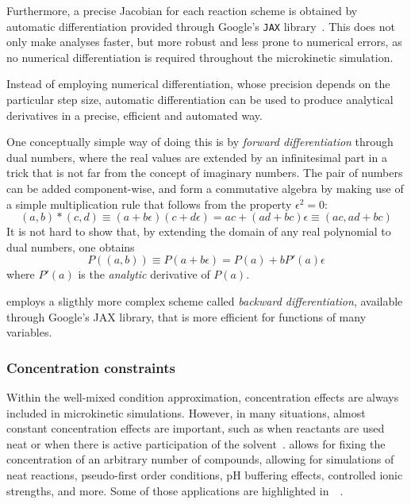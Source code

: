 Furthermore,
a precise Jacobian for each reaction scheme is obtained by automatic differentiation provided through Google's \texttt{JAX} library~\cite{jax2018github}.
This does not only make analyses faster,
but more robust and less prone to numerical errors,
as no numerical differentiation is required throughout the microkinetic simulation.

Instead of employing numerical differentiation,
whose precision depends on the
particular step size,
automatic differentiation can be used to produce
analytical derivatives in a precise,
efficient and automated way.

One conceptually simple way of doing this is by \emph{forward differentiation}
through dual numbers,
where the real values are extended by an infinitesimal
part in a trick that is not far from the concept of imaginary numbers.
The pair of numbers can be added component-wise,
and form a commutative algebra
by making use of a simple multiplication rule that follows from the property
$\epsilon^2 = 0$:
\begin{equation}
	(a,
	b) * (c,
	d)
	\equiv (a + b\epsilon)(c + d\epsilon)
	= a c + (a d + b c)\epsilon
	\equiv (a c,
	a d + b c)
\end{equation}
It is not hard to show that,
by extending the domain of any real polynomial to
dual numbers,
one obtains
\begin{equation}
	P((a,
	b)) \equiv P(a + b\epsilon) = P(a) + b P'(a) \epsilon
\end{equation}
where $P'(a)$ is the \emph{analytic} derivative of $P(a)$.

\overreact employs a sligthly more complex scheme called
\emph{backward differentiation},
available through Google's JAX library,
that
is more efficient for functions of many variables.

\subsubsection{Concentration constraints}

Within the well-mixed condition approximation,
concentration effects are always included in microkinetic simulations.
However,
in many situations,
almost constant concentration effects are important,
such as when reactants are used neat or when there is active participation of the solvent~\cite{Ryu_2018}.
\overreact allows for fixing the concentration of an arbitrary number of compounds,
allowing for simulations of neat reactions,
pseudo-first order conditions,
pH buffering effects,
controlled ionic strengths,
and more.
Some of those applications are highlighted in~\citeauthor{Schneider_2022}~\cite{Schneider_2022}.

